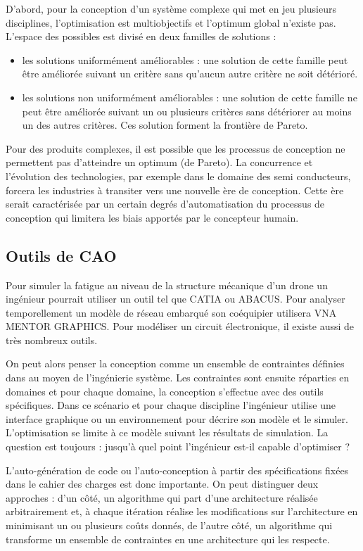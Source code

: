 \documentclass[11pt]{article}
\begin{document}
D'abord, pour la conception d'un système complexe qui met en jeu plusieurs disciplines, l'optimisation est multiobjectifs et l'optimum global n'existe pas.
L'espace des possibles est divisé en deux familles de solutions :
\begin{itemize}
\item les solutions uniformément améliorables : une solution de cette famille peut être améliorée suivant un critère sans qu'aucun autre critère ne soit détérioré.
\item les solutions non uniformément améliorables : une solution de cette famille ne peut être améliorée suivant un ou plusieurs critères sans détériorer au moins un des autres critères. Ces solution forment la frontière de Pareto.
\end{itemize}

Pour des produits complexes, il est possible que les processus de conception ne permettent pas d'atteindre un optimum (de Pareto). La concurrence et l'évolution des technologies, par exemple dans le domaine des semi conducteurs, forcera les industries à transiter vers une nouvelle ère de conception. Cette ère serait caractérisée par un certain degrés d'automatisation du processus de conception qui limitera les biais apportés par le concepteur humain.

\subsection{Outils de CAO}

Pour simuler la fatigue au niveau de la structure mécanique d'un drone un ingénieur pourrait utiliser un outil tel que CATIA ou ABACUS. Pour analyser temporellement un modèle de réseau embarqué son coéquipier utilisera VNA MENTOR GRAPHICS. Pour modéliser un circuit électronique, il existe aussi de très nombreux outils.

On peut alors penser la conception comme un ensemble de contraintes définies dans au moyen de l'ingénierie système. Les contraintes sont ensuite réparties en domaines et pour chaque domaine, la conception s'effectue avec des outils spécifiques. Dans ce scénario et pour chaque discipline l'ingénieur utilise une interface graphique ou un environnement pour décrire son modèle et le simuler. L'optimisation se limite à ce modèle suivant les résultats de simulation. La question est toujours : jusqu'à quel point l'ingénieur est-il capable d'optimiser ?

L’auto-génération de code ou l’auto-conception à partir des spécifications fixées dans le cahier des charges est donc importante. On peut distinguer deux approches : d'un côté, un algorithme qui part d’une architecture réalisée arbitrairement et, à chaque itération réalise les modifications sur l’architecture en minimisant un ou plusieurs coûts donnés, de l'autre côté, un algorithme qui transforme un ensemble de contraintes en une architecture qui les respecte.
\end{document}
